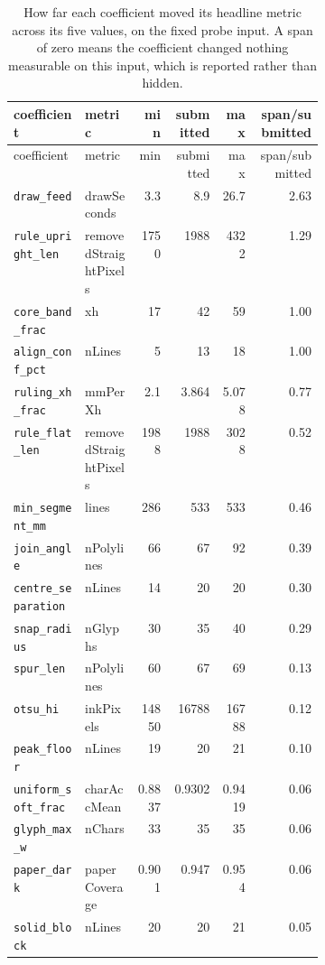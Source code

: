 \begin{longtable}{p{0.23\linewidth}p{0.17\linewidth}rrrr}
\caption{How far each coefficient moved its headline metric across its five values, on the fixed probe input. A span of zero means the coefficient changed nothing measurable on this input, which is reported rather than hidden.}\\
\toprule
\textsf{coefficient} & \textsf{metric} & \textsf{min} & \textsf{submitted} & \textsf{max} & \textsf{span/submitted} \\
\midrule
\endfirsthead
\toprule
\textsf{coefficient} & \textsf{metric} & \textsf{min} & \textsf{submitted} & \textsf{max} & \textsf{span/submitted} \\
\midrule
\endhead
\texttt{draw\_feed} & \textsf{drawSeconds} & 3.3 & 8.9 & 26.7 & 2.63 \\
\texttt{rule\_upright\_len} & \textsf{removedStraightPixels} & 1750 & 1988 & 4322 & 1.29 \\
\texttt{core\_band\_frac} & \textsf{xh} & 17 & 42 & 59 & 1.00 \\
\texttt{align\_conf\_pct} & \textsf{nLines} & 5 & 13 & 18 & 1.00 \\
\texttt{ruling\_xh\_frac} & \textsf{mmPerXh} & 2.1 & 3.864 & 5.078 & 0.77 \\
\texttt{rule\_flat\_len} & \textsf{removedStraightPixels} & 1988 & 1988 & 3028 & 0.52 \\
\texttt{min\_segment\_mm} & \textsf{lines} & 286 & 533 & 533 & 0.46 \\
\texttt{join\_angle} & \textsf{nPolylines} & 66 & 67 & 92 & 0.39 \\
\texttt{centre\_separation} & \textsf{nLines} & 14 & 20 & 20 & 0.30 \\
\texttt{snap\_radius} & \textsf{nGlyphs} & 30 & 35 & 40 & 0.29 \\
\texttt{spur\_len} & \textsf{nPolylines} & 60 & 67 & 69 & 0.13 \\
\texttt{otsu\_hi} & \textsf{inkPixels} & 14850 & 16788 & 16788 & 0.12 \\
\texttt{peak\_floor} & \textsf{nLines} & 19 & 20 & 21 & 0.10 \\
\texttt{uniform\_soft\_frac} & \textsf{charAccMean} & 0.8837 & 0.9302 & 0.9419 & 0.06 \\
\texttt{glyph\_max\_w} & \textsf{nChars} & 33 & 35 & 35 & 0.06 \\
\texttt{paper\_dark} & \textsf{paperCoverage} & 0.901 & 0.947 & 0.954 & 0.06 \\
\texttt{solid\_block} & \textsf{nLines} & 20 & 20 & 21 & 0.05 \\

\end{longtable}
